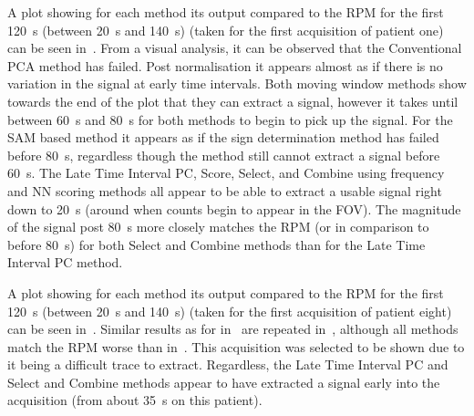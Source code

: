             A plot showing for each method its output compared to the \gls{RPM} for the first \SI{120}{\second} (between \SI{20}{\second} and \SI{140}{\second}) (taken for the first acquisition of patient one) can be seen in~. From a visual analysis, it can be observed that the Conventional \gls{PCA} method has failed. Post normalisation it appears almost as if there is no variation in the signal at early time intervals. Both moving window methods show towards the end of the plot that they can extract a signal, however it takes until between \SI{60}{\second} and \SI{80}{\second} for both methods to begin to pick up the signal. For the \gls{SAM} based method it appears as if the sign determination method has failed before \SI{80}{\second}, regardless though the method still cannot extract a signal before \SI{60}{\second}. The Late Time Interval \gls{PC}, Score, Select, and Combine using frequency and \gls{NN} scoring methods all appear to be able to extract a usable signal right down to \SI{20}{\second} (around when counts begin to appear in the \gls{FOV}). The magnitude of the signal post \SI{80}{\second} more closely matches the \gls{RPM} (or in comparison to before \SI{80}{\second}) for both Select and Combine methods than for the Late Time Interval \gls{PC} method.
            
            A plot showing for each method its output compared to the \gls{RPM} for the first \SI{120}{\second} (between \SI{20}{\second} and \SI{140}{\second}) (taken for the first acquisition of patient eight) can be seen in~. Similar results as for in~ are repeated in~, although all methods match the \gls{RPM} worse than in~. This acquisition was selected to be shown due to it being a difficult trace to extract. Regardless, the Late Time Interval \gls{PC} and Select and Combine methods appear to have extracted a signal early into the acquisition (from about \SI{35}{\second} on this patient).
            
